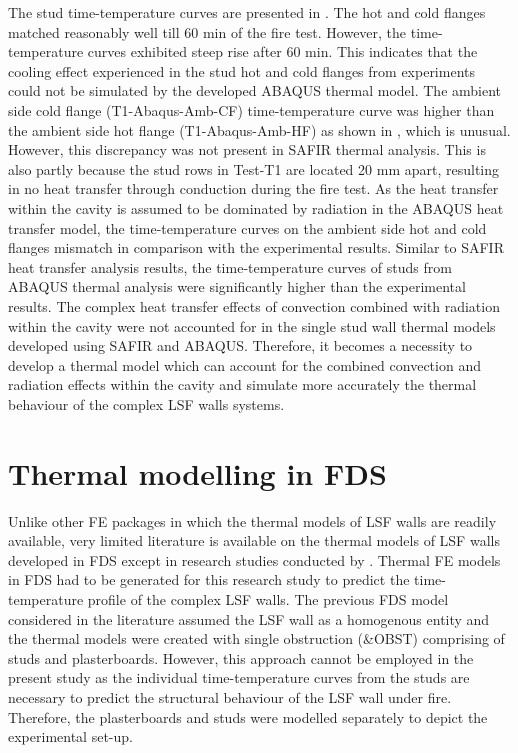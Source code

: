 The stud time-temperature curves are presented in . The hot and cold flanges matched reasonably well till 60 min of the fire test. However, the time-temperature curves exhibited steep rise after 60 min. This indicates that the cooling effect experienced in the stud hot and cold flanges from experiments could not be simulated by the developed ABAQUS thermal model. The ambient side cold flange (T1-Abaqus-Amb-CF) time-temperature curve was higher than the ambient side hot flange (T1-Abaqus-Amb-HF) as shown in , which is unusual. However, this discrepancy was not present in SAFIR thermal analysis. This is also partly because the stud rows in Test-T1 are located 20 mm apart, resulting in no heat transfer through conduction during the fire test. As the heat transfer within the cavity is assumed to be dominated by radiation in the ABAQUS heat transfer model, the time-temperature curves on the ambient side hot and cold flanges mismatch in comparison with the experimental results. Similar to SAFIR heat transfer analysis results, the time-temperature curves of studs from ABAQUS thermal analysis were significantly higher than the experimental results. The complex heat transfer effects of convection combined with radiation within the cavity were not accounted for in the single stud wall thermal models developed using SAFIR and ABAQUS. Therefore, it becomes a necessity to develop a thermal model which can account for the combined convection and radiation effects within the cavity and simulate more accurately the thermal behaviour of the complex LSF walls systems.

\section{Thermal modelling in FDS}

Unlike other FE packages in which the thermal models of LSF walls are readily available, very limited literature is available on the thermal models of LSF walls developed in FDS except in research studies conducted by \citet{Lazaro2016,Lazaro2018,Nguyen2018}. Thermal FE models in FDS had to be generated for this research study to predict the time-temperature profile of the complex LSF walls. The previous FDS model considered in the literature assumed the LSF wall as a homogenous entity and the thermal models were created with single obstruction (\&OBST) comprising of studs and plasterboards. However, this approach cannot be employed in the present study as the individual time-temperature curves from the studs are necessary to predict the structural behaviour of the LSF wall under fire. Therefore, the plasterboards and studs were modelled separately to depict the experimental set-up. 

